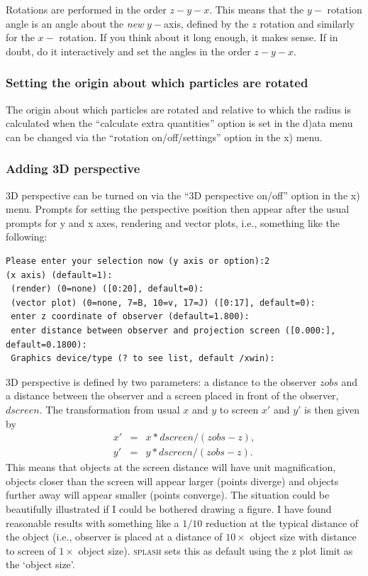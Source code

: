 \documentclass[a4paper,10pt]{article}
\newcommand{\splash}{\textsc{splash }}
\begin{document}
Rotations are performed in the order $z-y-x$. This means that the $y-$ rotation angle is an angle about the \emph{new} $y-$axis, defined by the $z$ rotation and similarly for the $x-$ rotation. If you think about it long enough, it makes sense. If in doubt, do it interactively and set the angles in the order $z-y-x$.

\subsubsection{ Setting the origin about which particles are rotated}
 The origin about which particles are rotated and relative to which the radius is calculated when the ``calculate extra quantities'' option is set in the d)ata menu can be changed via the ``rotation on/off/settings'' option in the x) menu.

\subsubsection{ Adding 3D perspective}
\label{sec:3Dperspective}
 3D perspective can be turned on via the ``3D perspective on/off'' option in the x) menu. Prompts for setting the perspective position then appear after the usual prompts for y and x axes, rendering and vector plots, i.e., something like the following:
\begin{verbatim}
Please enter your selection now (y axis or option):2
(x axis) (default=1):
 (render) (0=none) ([0:20], default=0):
 (vector plot) (0=none, 7=B, 10=v, 17=J) ([0:17], default=0):
 enter z coordinate of observer (default=1.800):
 enter distance between observer and projection screen ([0.000:], default=0.1800):
 Graphics device/type (? to see list, default /xwin): 
\end{verbatim}
 
  3D perspective is defined by two parameters: a distance to the observer $zobs$ and a distance between the observer and a screen placed in front of the observer, $dscreen$.
The transformation from usual $x$ and $y$ to screen $x'$ and $y'$ is then given by
\begin{eqnarray}
x' & = & x*dscreen/(zobs-z), \nonumber \\
y' & = & y*dscreen/(zobs-z).
\end{eqnarray}
 This means that objects at the screen distance will have unit magnification, objects closer than the
screen will appear larger (points diverge) and objects further away will appear smaller (points
converge). The situation could be beautifully illustrated if I could be bothered drawing a figure. I have found reasonable results with something like a $1/10$ reduction at the typical distance of the object (i.e., observer is placed at a distance of $10\times$ object size with distance to screen of $1\times$ object size). \splash sets this as default using the z plot limit as the `object size'.
\end{document}
